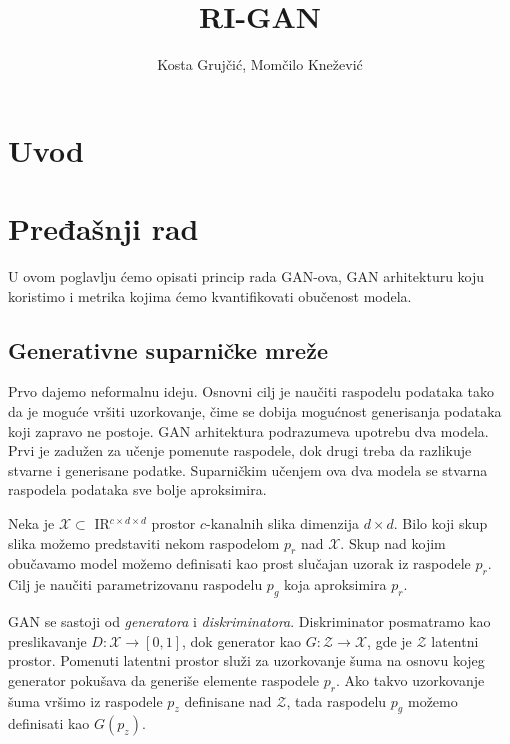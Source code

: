 \documentclass[12pt, a4paper]{article}
\newcommand{\R}{$ {\rm I\!R}$}
\begin{document}
\date{}
\title{RI-GAN}
\author{Kosta Grujčić, Momčilo Knežević}
\maketitle

\begin{abstract}
\end{abstract}

\section{Uvod}

\section{Pređašnji rad}
U ovom poglavlju ćemo opisati princip rada GAN-ova, GAN arhitekturu koju koristimo i metrika kojima ćemo kvantifikovati obučenost modela.

\subsection{Generativne suparničke mreže}
	Prvo dajemo neformalnu ideju. Osnovni cilj je naučiti raspodelu podataka tako da je moguće vršiti uzorkovanje, čime se dobija mogućnost generisanja podataka koji zapravo ne postoje. GAN arhitektura podrazumeva upotrebu dva modela. Prvi je zadužen za učenje pomenute raspodele, dok drugi treba da razlikuje stvarne i generisane podatke. Suparničkim učenjem ova dva modela se stvarna raspodela podataka sve bolje aproksimira.
	
	Neka je $\mathcal{X}\subset \R^{c \times d \times d}$ prostor $c$-kanalnih slika dimenzija $d\times d$. Bilo koji skup slika možemo predstaviti nekom raspodelom $p_r$ nad $\mathcal{X}$. Skup nad kojim obučavamo model možemo definisati kao prost slučajan uzorak iz raspodele $p_r$. Cilj je naučiti parametrizovanu raspodelu $p_g$ koja aproksimira $p_r$.
	
	GAN se sastoji od \textit{generatora} i \textit{diskriminatora}. Diskriminator posmatramo kao preslikavanje $D: \mathcal{X} \rightarrow [0, 1]$, dok generator kao $G:\mathcal{Z} \rightarrow \mathcal{X}$, gde je $\mathcal{Z}$ latentni prostor. Pomenuti latentni prostor služi za uzorkovanje šuma na osnovu kojeg generator pokušava da generiše elemente raspodele $p_r$. Ako takvo uzorkovanje šuma vršimo iz raspodele $p_z$ definisane nad $\mathcal{Z}$, tada raspodelu $p_g$ možemo definisati kao $G(p_z)$.
	
\end{document}
